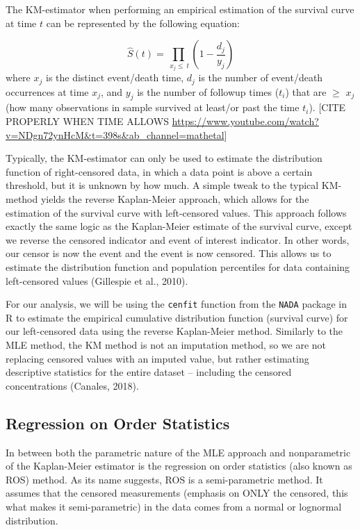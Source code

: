 \documentclass[12pt, twoside]{amherstthesis}
\begin{document}
The KM-estimator when performing an empirical estimation of the survival curve at time \(t\) can be represented by the following equation:

\[\hat{S}(t) = \prod_{\ x_j \le \ t }(1-\frac{d_j}{y_j})\]
where \(x_j\) is the distinct event/death time, \(d_j\) is the number of event/death occurrences at time \(x_j\), and \(y_j\) is the number of followup times (\(t_i\)) that are \(\ge\) \(x_j\) (how many observations in sample survived at least/or past the time \(t_i\)). {[}CITE PROPERLY WHEN TIME ALLOWS \url{https://www.youtube.com/watch?v=NDgn72ynHcM\&t=398s\&ab_channel=mathetal}{]}

Typically, the KM-estimator can only be used to estimate the distribution function of right-censored data, in which a data point is above a certain threshold, but it is unknown by how much. A simple tweak to the typical KM-method yields the reverse Kaplan-Meier approach, which allows for the estimation of the survival curve with left-censored values. This approach follows exactly the same logic as the Kaplan-Meier estimate of the survival curve, except we reverse the censored indicator and event of interest indicator. In other words, our censor is now the event and the event is now censored. This allows us to estimate the distribution function and population percentiles for data containing left-censored values (Gillespie et al., 2010).

For our analysis, we will be using the \texttt{cenfit} function from the \texttt{NADA} package in R to estimate the empirical cumulative distribution function (survival curve) for our left-censored data using the reverse Kaplan-Meier method. Similarly to the MLE method, the KM method is not an imputation method, so we are not replacing censored values with an imputed value, but rather estimating descriptive statistics for the entire dataset -- including the censored concentrations (Canales, 2018).

\hypertarget{ROS}{%
\subsection{Regression on Order Statistics}\label{ROS}}

In between both the parametric nature of the MLE approach and nonparametric of the Kaplan-Meier estimator is the regression on order statistics (also known as ROS) method. As its name suggests, ROS is a semi-parametric method. It assumes that the censored measurements (emphasis on ONLY the censored, this what makes it semi-parametric) in the data comes from a normal or lognormal distribution.
\end{document}
